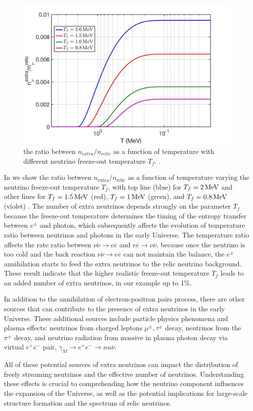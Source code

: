 \begin{figure}
\begin{center}
\includegraphics[width=0.9\linewidth]{./plots/ExtraNeutrinoRatio}
\caption{the ratio between $n_{extra}/n_{relic}$ as a function of temperature with different neutrino freeze-out temperature $T_f$. .}
\label{ExtraNeutrinoRatio}
\end{center}
\end{figure}


In  we show the ratio between $n_\mathrm{extra}/n_\mathrm{relic}$ as a function of temperature varying the neutrino freeze-out temperature $T_f$, with top line (blue) for $T_f=2\text{\,MeV}$ and other lines for $T_f=1.5\text{\,MeV}$ (red), $T_f=1 \text{\,MeV}$ (green), and  $T_f=0.8 \text{\,MeV}$ (violet) . The number of extra neutrinos depends strongly on the parameter $T_f$ because the freeze-out temperature determines the timing of the entropy transfer between $e^\pm$ and photon, which subsequently affects the evolution of temperature ratio between neutrinos and photons in the early Universe. The temperature ratio affects the rate ratio between $\nu\overline{\nu}\to e\overline{e}$ and $ e\overline{e}\to\nu\overline{\nu}$, because once the neutrino is too cold and the back reaction $\nu\overline{\nu}\to e\overline{e}$ can not maintain the balance, the $e^\pm$ annihilation starts to feed the extra neutrinos to the relic neutrino background. These result indicate  that the higher realistic freeze-out temperature $T_f$ leads to an added  number of extra neutrinos, in our example up to 1\%. 

In addition to the annihilation of electron-positron pairs process, there are other sources that can contribute to the presence of extra neutrinos in the early Universe. These additional sources include particle physics phenomena and plasma effects: neutrinos from charged leptons $\mu^\pm,\tau^\pm$ decay, neutrinos from the $\pi^\pm$ decay, and neutrino radiation from massive in plasma photon decay via virtual $e^+e^-$ pair, $\gamma_M\to e^+e^-\to nu\bar\nu$. 

All of these potential sources of extra neutrinos can impact the distribution of freely streaming neutrinos and the effective number of neutrinos. Understanding these effects is crucial to comprehending how the neutrino component influences the expansion of the Universe, as well as the potential implications for large-scale structure formation and the spectrum of relic neutrinos.
